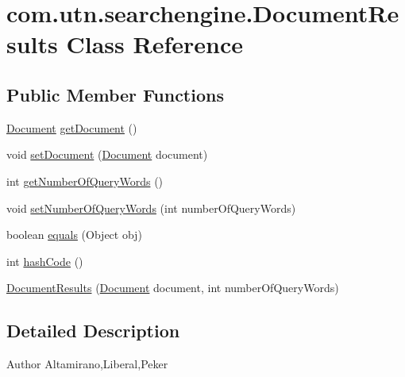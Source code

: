 \hypertarget{classcom_1_1utn_1_1searchengine_1_1_document_results}{\section{com.\-utn.\-searchengine.\-Document\-Results \-Class \-Reference}
\label{classcom_1_1utn_1_1searchengine_1_1_document_results}
}
\subsection*{\-Public \-Member \-Functions}
\begin{DoxyCompactItemize}
\item 
\hyperlink{classcom_1_1utn_1_1searchengine_1_1_document}{\-Document} \hyperlink{classcom_1_1utn_1_1searchengine_1_1_document_results_a5b373b1c0d5aca0e3ae7a6f8bed01c24}{get\-Document} ()
\item 
void \hyperlink{classcom_1_1utn_1_1searchengine_1_1_document_results_aa5862bdfa94ef0cc4799a0e81ca57055}{set\-Document} (\hyperlink{classcom_1_1utn_1_1searchengine_1_1_document}{\-Document} document)
\item 
int \hyperlink{classcom_1_1utn_1_1searchengine_1_1_document_results_a47caeb149a7fac9a6c2c2a2c7db88588}{get\-Number\-Of\-Query\-Words} ()
\item 
void \hyperlink{classcom_1_1utn_1_1searchengine_1_1_document_results_a6f1eae104e90cac795ab4b6a539b1668}{set\-Number\-Of\-Query\-Words} (int number\-Of\-Query\-Words)
\item 
boolean \hyperlink{classcom_1_1utn_1_1searchengine_1_1_document_results_a4e8d65095fbaec8fc689a9afb3997b9d}{equals} (\-Object obj)
\item 
int \hyperlink{classcom_1_1utn_1_1searchengine_1_1_document_results_a7b893c8148ad036accd14e6f8f310d2c}{hash\-Code} ()
\item 
\hyperlink{classcom_1_1utn_1_1searchengine_1_1_document_results_a28ee7d57701112cdfd77ffeff5643e76}{\-Document\-Results} (\hyperlink{classcom_1_1utn_1_1searchengine_1_1_document}{\-Document} document, int number\-Of\-Query\-Words)
\end{DoxyCompactItemize}


\subsection{\-Detailed \-Description}
\begin{DoxyAuthor}{\-Author}
\-Altamirano,\-Liberal,\-Peker 
\end{DoxyAuthor}



